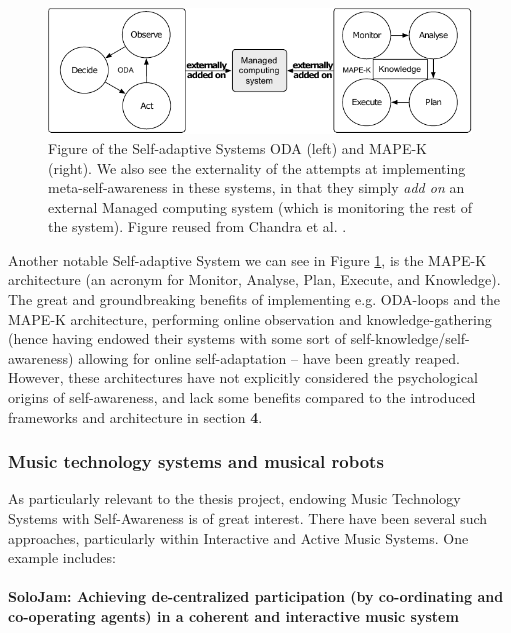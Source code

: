 		\begin{figure}[ht]
		\centering
		\includegraphics[width=\columnwidth]{Assets/DocSegments/Chapters/Background/Figures/Schema/oda_mapek.pdf}
		\caption[Previous and prevalent computational self adaptive agent frameworks.]{Figure of the Self-adaptive Systems ODA (left) and MAPE-K (right). We also see the externality of the attempts at implementing meta-self-awareness in these systems, in that they simply \textit{add on} an external Managed computing system (which is monitoring the rest of the system). Figure reused from Chandra et al. \cite{sacs16_ch4}.}
		\label{fig:oda_mapek}
		\end{figure}

		Another notable Self-adaptive System we can see in Figure \ref{fig:oda_mapek}, is the MAPE-K architecture (an acronym for Monitor, Analyse, Plan, Execute, and Knowledge). The great and groundbreaking benefits of implementing e.g. ODA-loops and the MAPE-K architecture, performing online observation and knowledge-gathering (hence having endowed their systems with some sort of self-knowledge/self-awareness) allowing for online self-adaptation -- have been greatly reaped. However, these architectures have not explicitly considered the psychological origins of self-awareness, and lack some benefits compared to the introduced frameworks and architecture in section \textbf{4}.
	
	
		\subsubsection{Music technology systems and musical robots}
		\label{music_tech_robots}

		As particularly relevant to the thesis project, endowing Music Technology Systems with Self-Awareness is of great interest. There have been several such approaches, particularly within Interactive and Active Music Systems. One example includes:

			\paragraph{SoloJam: Achieving de-centralized participation (by co-ordinating and co-operating agents) in a coherent and interactive music system \nl}

